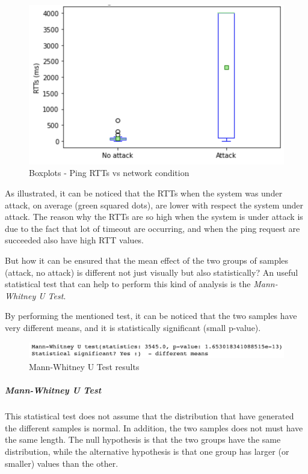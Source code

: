 \documentclass[fleqn, 11pt]{SelfArx} %
\begin{document}
\begin{figure}[H]\centering
    \includegraphics[width=\linewidth]{./ping/ping-boxplot1.png}
    \caption{Boxplots - Ping RTTs vs network condition}
\end{figure}

As illustrated, it can be noticed that the RTTs when the system was under attack, on average (green squared dots), are lower with respect the system under attack.
The reason why the RTTs are so high when the system is under attack is due to the fact that lot of timeout are occurring, and when the ping request are 
succeeded also have high RTT values.

But how it can be ensured that the mean effect of the two groups of samples (attack, no attack) is different not just visually but also statistically?
An useful statistical test that can help to perform this kind of analysis is the {\it{Mann-Whitney U Test}}.

By performing the mentioned test, it can be noticed that the two samples have very different means, and it is statistically significant (small p-value).

\begin{figure}[H]\centering
    \includegraphics[width=\linewidth]{./ping/mannwhitneyu1.png}
    \caption{Mann-Whitney U Test results}
	\label{fig:mannwhitneyu1}
\end{figure}

\subparagraph{Mann-Whitney U Test \cite{MannWhitneyU}}
This statistical test does not assume that the distribution that have generated the different samples is normal.
In addition, the two samples does not must have the same length.
The null hypothesis is that the two groups have the same distribution, while the alternative hypothesis is that one group has larger (or smaller) values than the other.\\
\end{document}
